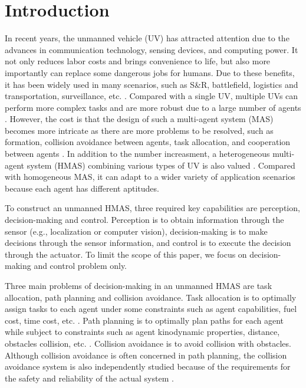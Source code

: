 \documentclass[journal,12pt,onecolumn,draftclsnofoot,]{IEEEtran}
\begin{document}
\section{Introduction}
In recent years, the unmanned vehicle (UV) has attracted attention due to the advances in communication technology, sensing devices, and computing power. It not only reduces labor costs and brings convenience to life, but also more importantly can replace some dangerous jobs for humans. Due to these benefits, it has been widely used in many scenarios, such as S\&R, battlefield, logistics and transportation, surveillance, etc. \cite{9700861}. Compared with a single UV, multiple UVs can perform more complex tasks and are more robust due to a large number of agents \cite{8352646}. However, the cost is that the design of such a multi-agent system (MAS) becomes more intricate as there are more problems to be resolved, such as formation, collision avoidance between agents, task allocation, and cooperation between agents \cite{chen2019control}. In addition to the number increasment, a heterogeneous multi-agent system (HMAS) combining various types of UV is also valued \cite{9371292}. Compared with homogeneous MAS, it can adapt to a wider variety of application scenarios because each agent has different aptitudes.

To construct an unmanned HMAS, three required key capabilities are perception, decision-making and control. Perception is to obtain information through the sensor (e.g., localization or computer vision), decision-making is to make decisions through the sensor information, and control is to execute the decision through the actuator. To limit the scope of this paper, we focus on decision-making and control problem only.

Three main problems of decision-making in an unmanned HMAS are task allocation, path planning and collision avoidance. Task allocation is to optimally assign tasks to each agent under some constraints such as agent capabilities, fuel cost, time cost, etc. \cite{skaltsis2021survey}. Path planning is to optimally plan paths for each agent while subject to constraints such as agent kinodynamic properties, distance, obstacles collision, etc. \cite{zhang2018path}. Collision avoidance is to avoid collision with obstacles. Although collision avoidance is often concerned in path planning, the collision avoidance system is also independently studied because of the requirements for the safety and reliability of the actual system \cite{9108245}.
\end{document}
